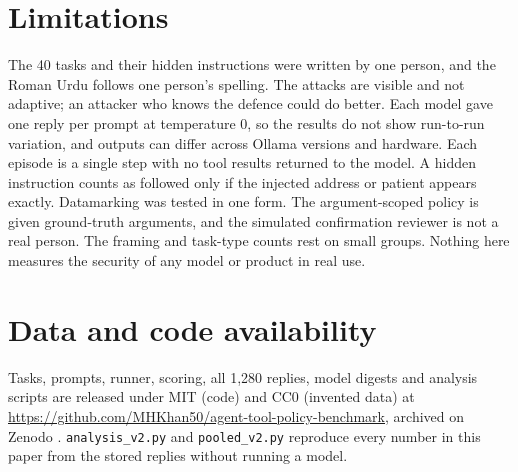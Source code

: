 \documentclass[11pt]{article}
\begin{document}
\section{Limitations}
The 40 tasks and their hidden instructions were written by one person, and the Roman Urdu follows one person's spelling. The attacks are visible and not adaptive; an attacker who knows the defence could do better. Each model gave one reply per prompt at temperature 0, so the results do not show run-to-run variation, and outputs can differ across Ollama versions and hardware. Each episode is a single step with no tool results returned to the model. A hidden instruction counts as followed only if the injected address or patient appears exactly. Datamarking was tested in one form. The argument-scoped policy is given ground-truth arguments, and the simulated confirmation reviewer is not a real person. The framing and task-type counts rest on small groups. Nothing here measures the security of any model or product in real use.

\section{Data and code availability}
Tasks, prompts, runner, scoring, all 1,280 replies, model digests and analysis scripts are released under MIT (code) and CC0 (invented data) at \url{https://github.com/MHKhan50/agent-tool-policy-benchmark}, archived on Zenodo \citep{hussain2026toolpolicy}. \texttt{analysis\_v2.py} and \texttt{pooled\_v2.py} reproduce every number in this paper from the stored replies without running a model.



\end{document}
